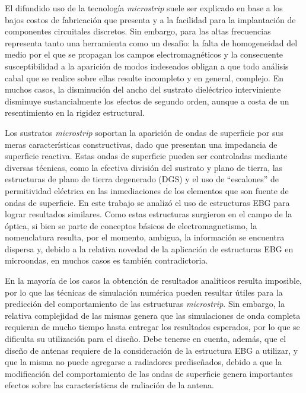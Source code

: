 

El difundido uso de la tecnología \textit{microstrip} suele ser explicado en base a los bajos costos de fabricación que presenta y a la facilidad para la implantación de componentes circuitales discretos. Sin embargo, para las altas frecuencias representa tanto una herramienta como un desafío: la falta de homogeneidad del medio por el que se propagan los campos electromagnéticos y la consecuente susceptibilidad a la aparición de modos indeseados obligan a que todo análisis cabal que se realice sobre ellas resulte incompleto y en general, complejo. En muchos casos, la disminución del ancho del sustrato dieléctrico interviniente disminuye sustancialmente los efectos de segundo orden, aunque a costa de un resentimiento en la rigidez estructural.

Los sustratos \textit{microstrip} soportan la aparición de ondas de superficie por sus meras características constructivas, dado que presentan una impedancia de superficie reactiva. Estas ondas de superficie pueden ser controladas mediante diversas técnicas, como la efectiva división del sustrato y plano de tierra, las estructuras de plano de tierra degenerado (DGS) y el uso de \enquote{escalones} de permitividad eléctrica en las inmediaciones de los elementos que son fuente de ondas de superficie. En este trabajo se analizó el uso de estructuras EBG para lograr resultados similares. Como estas estructuras surgieron en el campo de la óptica, si bien se parte de conceptos básicos de electromagnetismo, la nomenclatura resulta, por el momento, ambigua, la información se encuentra dispersa y, debido a la relativa novedad de la aplicación de estructuras EBG en microondas, en muchos casos es también contradictoria.

En la mayoría de los casos la obtención de resultados analíticos resulta imposible, por lo que las técnicas de simulación numérica pueden resultar útiles para la predicción del comportamiento de las estructuras \textit{microstrip}. Sin embargo, la relativa complejidad de las mismas genera que las simulaciones de onda completa requieran de mucho tiempo hasta entregar los resultados esperados, por lo que se dificulta su utilización para el diseño. Debe tenerse en cuenta, además, que el diseño de antenas requiere de la consideración de la estructura EBG a utilizar, y que la misma no puede agregarse a radiadores prediseñados, debido a que la modificación del comportamiento de las ondas de superficie genera importantes efectos sobre las características de radiación de la antena.

